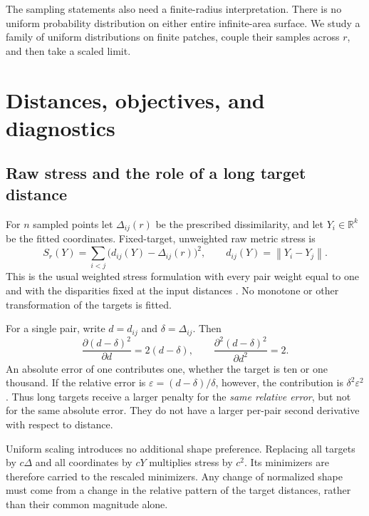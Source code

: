 \documentclass[11pt]{article}
\theoremstyle{remark}\newtheorem{remark}[proposition]{Remark}
\newcommand{\R}{\mathbb R}
\newcommand{\norm}[1]{\left\lVert#1\right\rVert}
\begin{document}
The sampling statements also need a finite-radius interpretation. There is no
uniform probability distribution on either entire infinite-area surface. We
study a family of uniform distributions on finite patches, couple their
samples across $r$, and then take a scaled limit.

\section{Distances, objectives, and diagnostics}\label{sec:definitions}

\subsection{Raw stress and the role of a long target distance}
For $n$ sampled points let $\Delta_{ij}(r)$ be the prescribed dissimilarity,
and let $Y_i\in\R^k$ be the fitted coordinates. Fixed-target, unweighted raw
metric stress is
\begin{equation}\label{eq:stress}
 S_r(Y)=\sum_{i<j}\bigl(d_{ij}(Y)-\Delta_{ij}(r)\bigr)^2,
 \qquad d_{ij}(Y)=\norm{Y_i-Y_j}.
\end{equation}
This is the usual weighted stress formulation with every pair weight equal
to one and with the disparities fixed at the input distances
\citep[Section 2, Eq.~(1)]{mair2022}. No monotone or other transformation of the
targets is fitted.

For a single pair, write $d=d_{ij}$ and $\delta=\Delta_{ij}$. Then
\begin{equation}
 \frac{\partial(d-\delta)^2}{\partial d}=2(d-\delta),\qquad
 \frac{\partial^2(d-\delta)^2}{\partial d^2}=2.
\end{equation}
An absolute error of one contributes one, whether the target is ten or one
thousand. If the relative error is $\varepsilon=(d-\delta)/\delta$, however,
the contribution is $\delta^2\varepsilon^2$. Thus long targets receive a larger
penalty for the \emph{same relative error}, but not for the same absolute error.
They do not have a larger per-pair second derivative with respect to distance.

Uniform scaling introduces no additional shape preference. Replacing all
targets by $c\Delta$ and all coordinates by $cY$ multiplies stress by $c^2$.
Its minimizers are therefore carried to the rescaled minimizers. Any change
of normalized shape must come from a change in the relative pattern of the
target distances, rather than their common magnitude alone.
\end{document}
